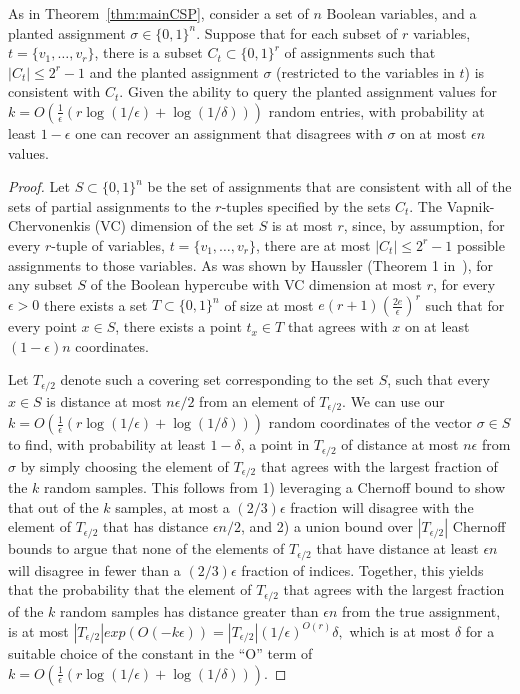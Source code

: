 \documentclass[anon,12pt]{colt2018}
\newcommand{\eps}{\epsilon}
\begin{document}
\begin{proposition}\label{prop:vc}
As in Theorem~\ref{thm:mainCSP}, consider a set of $n$ Boolean variables, and a planted assignment $\sigma\in \{0,1\}^n.$  Suppose that for each subset of $r$ variables, $t=\{v_1,\ldots,v_r\}$, there is a subset $C_t \subset \{0,1\}^r$ of assignments such that $|C_t| \le 2^r -1$ and the planted assignment $\sigma$ (restricted to the variables in $t$) is consistent with $C_t$.   Given the ability to query the planted assignment values for $k=O\left(\frac{1}{\eps}\left(r \log(1/\eps)+\log(1/\delta)\right)\right)$ random entries, with probability at least $1-\eps$ one can recover an assignment that disagrees with $\sigma$ on at most $\eps n$ values.
\end{proposition}
\begin{proof}%
Let $S\subset \{0,1\}^n$ be the set of assignments that are consistent with all of the sets of partial assignments to the $r$-tuples specified by the sets $C_t$.  The Vapnik-Chervonenkis (VC) dimension of the set $S$ is at most $r$, since, by assumption, for every $r$-tuple of variables,  $t=\{v_1,\ldots,v_r\}$, there are at most $|C_t| \le 2^{r}-1$ possible assignments to those variables.     As was shown by Haussler (Theorem 1 in~\cite{haussler1995sphere}), for any subset $S$ of the Boolean hypercube with VC dimension at most $r$, for every $\eps>0$ there exists a set $T \subset \{0,1\}^n$ of size at most $e(r+1)\left(\frac{2e}{\eps}\right)^r$ such that for every point $x \in S$, there exists a point $t_x \in T$ that agrees with $x$ on at least $(1-\eps)n$ coordinates.    

Let $T_{\eps/2}$ denote such a covering set corresponding to the set $S$, such that every $x \in S$ is distance at most $n\eps/2$ from an element of $T_{\eps/2}$.  We can use our $k = O\left(\frac{1}{\eps}\left(r \log(1/\eps)+\log(1/\delta)\right)\right)$ random coordinates of the vector $\sigma \in S$ to find, with probability at least $1-\delta$, a point in $T_{\eps/2}$ of distance at most $n\eps$ from $\sigma$ by simply choosing the element of $T_{\eps/2}$ that agrees with the largest fraction of the $k$ random samples.  This follows from 1) leveraging a Chernoff bound to show that out of the $k$ samples, at most a $(2/3) \eps$ fraction will disagree with the element of $T_{\eps/2}$ that has distance $\eps n /2$, and 2) a union bound over $|T_{\eps/2}|$ Chernoff bounds to argue that none of the elements of $T_{\eps/2}$ that have distance at least $\eps n$ will disagree in fewer than a $(2/3) \eps$ fraction of indices.  Together, this yields that the probability that the element of $T_{\eps/2}$ that agrees with the largest fraction of the $k$ random samples has distance greater than $\eps n$ from the true assignment, is at most $|T_{\eps/2}|exp(O(-k \eps)) = |T_{\eps/2}| (1/\eps)^{O(r)} \delta,$ which is at most $\delta$ for a suitable choice of the constant in the ``O'' term of $k=O\left(\frac{1}{\eps}\left(r \log(1/\eps)+\log(1/\delta)\right)\right)$.
\end{proof}
\end{document}
